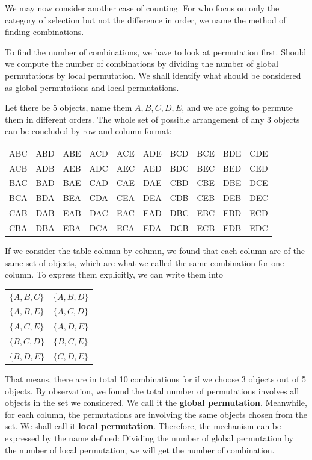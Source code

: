 \documentclass[12pt]{article}
\begin{document}
    We may now consider another case of counting. For who focus on only the category of selection but not the difference in order, we name the method of finding combinations.

    To find the number of combinations, we have to look at permutation first. Should we compute the number of combinations by dividing the number of global permutations by local permutation. We shall identify what should be considered as global permutations and local permutations.

    Let there be 5 objects, name them $A,B,C,D,E$, and we are going to permute them in different orders. The whole set of possible arrangement of any 3 objects can be concluded by row and column format:

    \begin{center}
        \begin{tabular}{c c c c c c c c c c}
            ABC&ABD&ABE&ACD&ACE&ADE&BCD&BCE&BDE&CDE\\
            ACB&ADB&AEB&ADC&AEC&AED&BDC&BEC&BED&CED\\
            BAC&BAD&BAE&CAD&CAE&DAE&CBD&CBE&DBE&DCE\\
            BCA&BDA&BEA&CDA&CEA&DEA&CDB&CEB&DEB&DEC\\
            CAB&DAB&EAB&DAC&EAC&EAD&DBC&EBC&EBD&ECD\\
            CBA&DBA&EBA&DCA&ECA&EDA&DCB&ECB&EDB&EDC
        \end{tabular}
    \end{center}

    If we consider the table column-by-column, we found that each column are of the same set of objects, which are what we called the same combination for one column. To express them explicitly, we can write them into

    \begin{center}
        \begin{tabular}{c c}
            $\{A,B,C\}$&$\{A,B,D\}$\\
            $\{A,B,E\}$&$\{A,C,D\}$\\
            $\{A,C,E\}$&$\{A,D,E\}$\\
            $\{B,C,D\}$&$\{B,C,E\}$\\
            $\{B,D,E\}$&$\{C,D,E\}$
        \end{tabular}
    \end{center}

    That means, there are in total 10 combinations for if we choose 3 objects out of 5 objects. By observation, we found the total number of permutations involves all objects in the set we considered. We call it the \textbf{global permutation}. Meanwhile, for each column, the permutations are involving the same objects chosen from the set. We shall call it \textbf{local permutation}. Therefore, the mechanism can be expressed by the name defined: Dividing the number of global permutation by the number of local permutation, we will get the number of combination.
\end{document}
